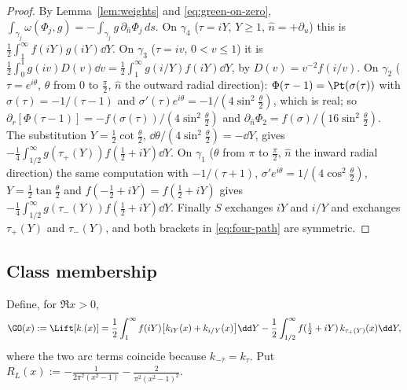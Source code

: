 \begin{proof}
By Lemma~\ref{lem:weights} and \eqref{eq:green-on-zero}, $\int_{\gamma_j}\omega(\Phi_j,g)=-\int_{\gamma_j}g\,\partial_{\hat n}\Phi_j\,ds$.
On $\gamma_4$ ($\tau=iY$, $Y\ge1$, $\hat n=+\partial_u$) this is $\frac12\int_1^\infty f(iY)g(iY)\dd Y$. On $\gamma_3$ ($\tau=iv$, $0<v\le1$) it is
$\frac12\int_0^1g(iv)D(v)\dd v=\frac12\int_1^\infty g(i/Y)f(iY)\dd Y$, by $D(v)=v^{-2}f(i/v)$. On $\gamma_2$ ($\tau=e^{i\theta}$, $\theta$ from $0$ to
$\frac\pi2$, $\hat n$ the outward radial direction): $\Phi(\tau-1)=\Pt(\sigma(\tau))$ with $\sigma(\tau)=-1/(\tau-1)$ and
$\sigma'(\tau)e^{i\theta}=-1/(4\sin^2\frac\theta2)$, which is real; so $\partial_r[\Phi(\tau-1)]=-f(\sigma(\tau))/(4\sin^2\frac\theta2)$ and
$\partial_{\hat n}\Phi_2=f(\sigma)/(16\sin^2\frac\theta2)$. The substitution $Y=\frac12\cot\frac\theta2$, $\dd\theta/(4\sin^2\frac\theta2)=-\dd Y$, gives
$-\frac14\int_{1/2}^\infty g(\tau_+(Y))f(\frac12+iY)\dd Y$. On $\gamma_1$ ($\theta$ from $\pi$ to $\frac\pi2$, $\hat n$ the inward radial direction)
the same computation with $-1/(\tau+1)$, $\sigma'e^{i\theta}=1/(4\cos^2\frac\theta2)$, $Y=\frac12\tan\frac\theta2$ and $f(-\frac12+iY)=f(\frac12+iY)$
gives $-\frac14\int_{1/2}^\infty g(\tau_-(Y))f(\frac12+iY)\dd Y$. Finally $S$ exchanges $iY$ and $i/Y$ and exchanges $\tau_+(Y)$ and $\tau_-(Y)$,
and both brackets in \eqref{eq:four-path} are symmetric.
\end{proof}

\subsection{Class membership}

Define, for $\Re x>0$,
\begin{equation}\label{eq:GO}
\GO(x):=\Lift[k_\cdot(x)]=\frac12\int_1^\infty f(iY)\big[k_{iY}(x)+k_{i/Y}(x)\big]\dd Y-\frac12\int_{1/2}^\infty f(\tfrac12+iY)\,k_{\tau_+(Y)}(x)\dd Y ,
\end{equation}
where the two arc terms coincide because $k_{-\bar\tau}=k_\tau$. Put $R_L(x):=-\frac1{2\pi^2(x^2-1)}-\frac2{\pi^2(x^2-1)^2}$.


